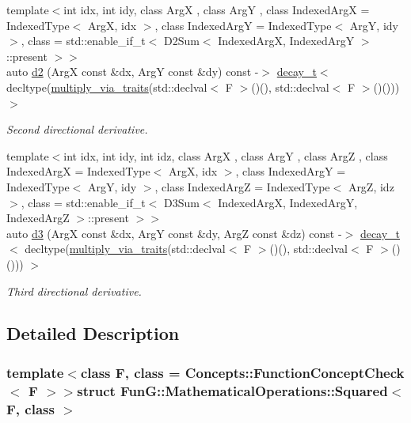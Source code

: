 \begin{DoxyCompactItemize}
{\footnotesize template$<$int idx, int idy, class Arg\-X , class Arg\-Y , class Indexed\-Arg\-X  = Indexed\-Type$<$ Arg\-X, idx $>$, class Indexed\-Arg\-Y  = Indexed\-Type$<$ Arg\-Y, idy $>$, class  = std\-::enable\-\_\-if\-\_\-t$<$ D2\-Sum$<$ Indexed\-Arg\-X, Indexed\-Arg\-Y $>$\-::present $>$$>$ }\\auto \hyperlink{structFunG_1_1MathematicalOperations_1_1Squared_a56fbf3854a9c39c7c19f1a65c6f1e126}{d2} (Arg\-X const \&dx, Arg\-Y const \&dy) const -\/$>$ \hyperlink{namespaceFunG_a7ff91644f18a190ac3d4fc9e970ebe2e}{decay\-\_\-t}$<$ decltype(\hyperlink{namespaceFunG_a839a72c59a888ed89d3efe38897cc376}{multiply\-\_\-via\-\_\-traits}(std\-::declval$<$ F $>$()(), std\-::declval$<$ F $>$()())) $>$
\begin{DoxyCompactList}\small\item\em Second directional derivative. \end{DoxyCompactList}\item 
{\footnotesize template$<$int idx, int idy, int idz, class Arg\-X , class Arg\-Y , class Arg\-Z , class Indexed\-Arg\-X  = Indexed\-Type$<$ Arg\-X, idx $>$, class Indexed\-Arg\-Y  = Indexed\-Type$<$ Arg\-Y, idy $>$, class Indexed\-Arg\-Z  = Indexed\-Type$<$ Arg\-Z, idz $>$, class  = std\-::enable\-\_\-if\-\_\-t$<$                           D3\-Sum$<$ Indexed\-Arg\-X, Indexed\-Arg\-Y, Indexed\-Arg\-Z $>$\-::present $>$$>$ }\\auto \hyperlink{structFunG_1_1MathematicalOperations_1_1Squared_a012ad3783f0243d2439f24fae70af28e}{d3} (Arg\-X const \&dx, Arg\-Y const \&dy, Arg\-Z const \&dz) const -\/$>$ \hyperlink{namespaceFunG_a7ff91644f18a190ac3d4fc9e970ebe2e}{decay\-\_\-t}$<$ decltype(\hyperlink{namespaceFunG_a839a72c59a888ed89d3efe38897cc376}{multiply\-\_\-via\-\_\-traits}(std\-::declval$<$ F $>$()(), std\-::declval$<$ F $>$()())) $>$
\begin{DoxyCompactList}\small\item\em Third directional derivative. \end{DoxyCompactList}\end{DoxyCompactItemize}


\subsection{Detailed Description}
\subsubsection*{template$<$class F, class = Concepts\-::\-Function\-Concept\-Check$<$ F $>$$>$struct Fun\-G\-::\-Mathematical\-Operations\-::\-Squared$<$ F, class $>$}

